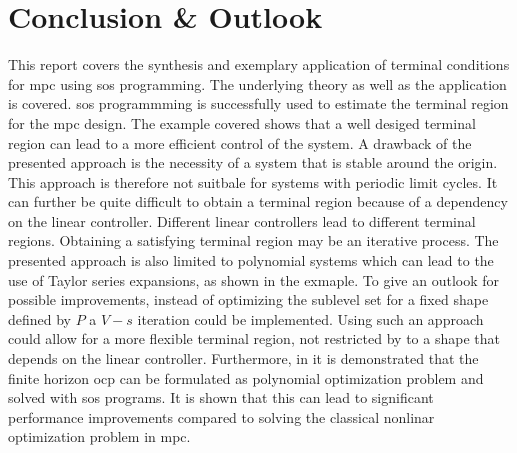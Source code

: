 \documentclass[10pt,a4paper,titlepage]{article}
\begin{document}
\newpage
\section{Conclusion \& Outlook}
\label{sec:conclusion}

This report covers the synthesis and exemplary application of terminal conditions for \gls{mpc} using \gls{sos} programming. The underlying theory as well as the 
application is covered. \gls{sos} programmming is successfully used to estimate the terminal region for the \gls{mpc} design. The example covered shows that a 
well desiged terminal region can lead to a more efficient control of the system. A drawback of the presented approach is the necessity of a system that is 
stable around the origin. This approach is therefore not suitbale for systems with periodic limit cycles. It can further be quite difficult to obtain a 
terminal region because of a dependency on the linear controller. Different linear controllers lead to different terminal regions. Obtaining a satisfying terminal
region may be an iterative process. The presented approach is also limited to polynomial systems which can lead to the use of Taylor series expansions, as 
shown in the exmaple. To give an outlook for possible improvements, instead of optimizing the sublevel set for a fixed shape defined by $P$ a $V-s$ iteration could be implemented. 
Using such an approach could allow for a more flexible terminal region, not restricted by to a shape that depends on the linear controller. Furthermore, in \cite{RaffAllgoewer} it is demonstrated that the finite horizon \gls{ocp} can be formulated as polynomial optimization problem and solved with \gls{sos} programs.
It is shown that this can lead to significant performance improvements compared to solving the classical nonlinar optimization problem in \gls{mpc}. 




\pagebreak




\end{document}
